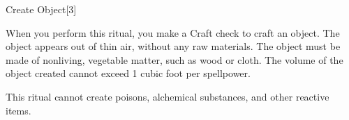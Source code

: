 \begin{spellsection}{Create Object}[3]
    \begin{spellheader}
    \end{spellheader}
    \begin{spellcontent}
        \begin{spelltargetinginfo}
            \spellrng{\rngclose}
        \end{spelltargetinginfo}
        \begin{spelleffects}

            \spelleffect When you perform this ritual, you make a Craft check to craft an object. The object appears out of thin air, without any raw materials. The object must be made of nonliving, vegetable matter, such as wood or cloth. The volume of the object created cannot exceed 1 cubic foot per spellpower.
            \spelldur \durext
        \end{spelleffects}
    \end{spellcontent}
    \begin{spellfooter}
        \spellnotes This ritual cannot create poisons, alchemical substances, and other reactive items.
    \end{spellfooter}
\end{spellsection}

